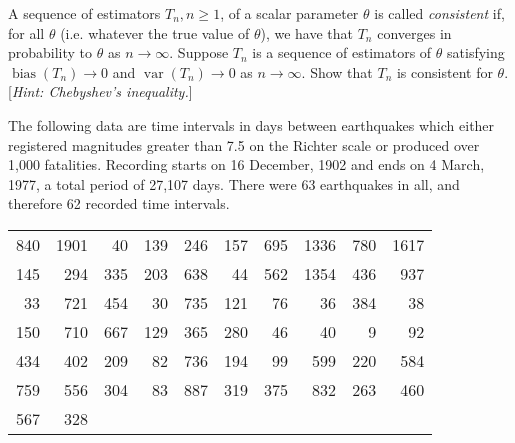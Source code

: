 \documentclass[answers]{exam}
\begin{document}
\begin{questions}



\question%
A sequence of estimators $T_{n}, n \geqslant 1$, of a scalar parameter $\theta$ is called \emph{consistent} if, for all $\theta$ (i.e. whatever the true value of $\theta$), we have that $T_{n}$ converges in probability to $\theta$ as $n \to \infty$. Suppose $T_{n}$ is a sequence of estimators of $\theta$ satisfying $\operatorname{bias}(T_{n}) \to 0$ and $\operatorname{var}(T_{n}) \to 0$ as $n \to \infty$. Show that $T_{n}$ is consistent for $\theta$. [\emph{Hint: Chebyshev's inequality.}]



\question%
The following data are time intervals in days between earthquakes which either registered magnitudes greater than 7.5 on the Richter scale or produced over 1,000 fatalities. Recording starts on 16 December, 1902 and ends on 4 March, 1977, a total period of 27,107 days. There were 63 earthquakes in all, and therefore 62 recorded time intervals. \begin{center}\begin{tabular}{rrrrrrrrrr}
	\hline
	840 & 1901 & 40 & 139 & 246 & 157 & 695 & 1336 & 780 & 1617 \\
	145 & 294 & 335 & 203 & 638 & 44 & 562 & 1354 & 436 & 937 \\
	33 & 721 & 454 & 30 & 735 & 121 & 76 & 36 & 384 & 38 \\
	150 & 710 & 667 & 129 & 365 & 280 & 46 & 40 & 9 & 92 \\
	434 & 402 & 209 & 82 & 736 & 194 & 99 & 599 & 220 & 584 \\
	759 & 556 & 304 & 83 & 887 & 319 & 375 & 832 & 263 & 460 \\
	567 & 328 &  &  &  &  &  &  &  &  \\
	\hline
\end{tabular}\end{center}
\end{questions}
\end{document}
